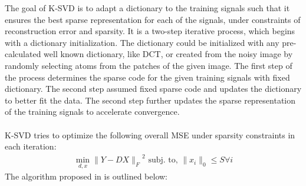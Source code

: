 \documentclass{article} %
\begin{document}
The goal of K-SVD is to adapt a dictionary to the training signals such that it ensures the best sparse representation for each of the signals, under constraints of reconstruction error and sparsity. It is a two-step iterative process, which begins with a dictionary initialization.  The dictionary could be initialized with any pre-calculated well known dictionary, like DCT, or created from the noisy image by randomly selecting atoms from the patches of the given image. 
The first step of the process determines the sparse code for the given training signals with fixed dictionary. The second step assumed fixed sparse code and updates the dictionary to better fit the data. The second step further updates the sparse representation of the training signals to accelerate convergence. \\ \\
K-SVD tries to optimize the following overall MSE under sparsity constraints in each iteration:\\
\begin{align}
\min\limits_{d,x}{\|Y-DX\|_F}^2 \text{ subj. to, } \|x_i\|_0 \leq S \forall i
\end{align}
The algorithm proposed in \cite{aharon2006svd} is outlined below:\\
\end{document}

